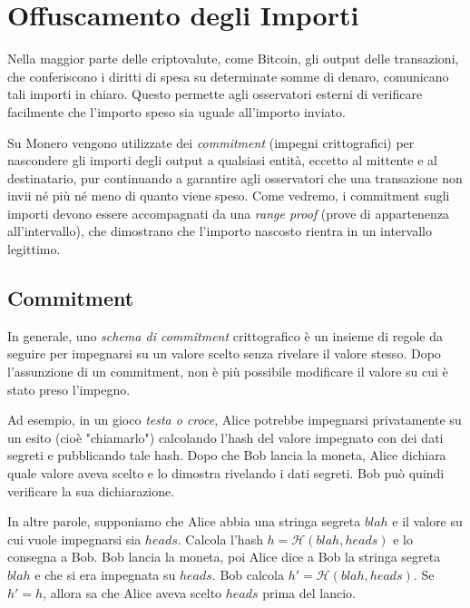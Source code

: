 \chapter{Offuscamento degli Importi}
\label{chapter:pedersen-commitments}

Nella maggior parte delle criptovalute, come Bitcoin, gli output delle transazioni, che conferiscono i diritti di spesa su determinate somme di denaro, comunicano tali importi in chiaro. Questo permette agli osservatori esterni di verificare facilmente che l'importo speso sia uguale all'importo inviato.

Su Monero vengono utilizzate dei {\em commitment} (impegni crittografici) per nascondere gli importi degli output a qualsiasi entità, eccetto al mittente e al destinatario, pur continuando a garantire agli osservatori che una transazione non invii né più né meno di quanto viene speso. Come vedremo, i commitment sugli importi devono essere accompagnati da una \emph{range proof} (prove di appartenenza all'intervallo), che dimostrano che l'importo nascosto rientra in un intervallo legittimo.



\section{Commitment}
\label{sec:commitments}

In generale, uno {\em schema di commitment} crittografico è un insieme di regole da seguire per impegnarsi su un valore scelto senza rivelare il valore stesso. Dopo l'assunzione di un commitment, non è più possibile modificare il valore su cui è stato preso l'impegno.

Ad esempio, in un gioco {\em testa o croce}, Alice potrebbe impegnarsi privatamente su un esito (cioè "chiamarlo") calcolando l'hash del valore impegnato con dei dati segreti e pubblicando tale hash. Dopo che Bob lancia la moneta, Alice dichiara quale valore aveva scelto e lo dimostra rivelando i dati segreti. Bob può quindi verificare la sua dichiarazione.

In altre parole, supponiamo che Alice abbia una stringa segreta $blah$ e il valore su cui vuole impegnarsi sia $heads$. Calcola l'hash $h = \mathcal{H}(blah, heads)$ e lo consegna a Bob. Bob lancia la moneta, poi Alice dice a Bob la stringa segreta $blah$ e che si era impegnata su $heads$. Bob calcola $h' = \mathcal{H}(blah, heads)$. Se $h' = h$, allora sa che Alice aveva scelto $heads$ prima del lancio.

